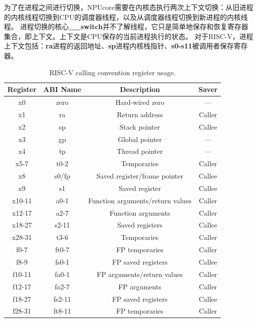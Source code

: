 为了在进程之间进行切换，NPUcore需要在内核态执行两次上下文切换：从旧进程的内核线程切换到CPU的调度器线程，以及从调度器线程切换到新进程的内核线程。
进程切换的核心\textbf{\_\_switch}并不了解线程，它只是简单地保存和恢复寄存器集合，即上下文。上下文是CPU保存的当前进程执行的状态。
对于RISC-V，进程上下文包括：\textbf{ra}进程的返回地址、\textbf{sp}进程内核栈指针、\textbf{s0-s11}被调用者保存寄存器。\\

\begin{table}[h]
	\centering
	\begin{tabular}{|c|c|c|c|}
		\hline
		\textbf{Register} & \textbf{ABI Name} & \textbf{Description} & \textbf{Saver} \\
		\hline
		x0 & zero & Hard-wired zero & --- \\
		x1 & ra & Return address & Caller \\
		x2 & sp & Stack pointer & Callee \\
		x3 & gp & Global pointer & --- \\
		x4 & tp & Thread pointer & --- \\
		x5-7 & t0-2 & Temporaries & Caller \\
		x8 & s0/fp & Saved register/frame pointer & Callee \\
		x9 & s1 & Saved register & Callee \\
		x10-11 & a0-1 & Function arguments/return values & Caller \\
		x12-17 & a2-7 & Function arguments & Caller \\
		x18-27 & s2-11 & Saved registers & Callee \\
		x28-31 & t3-6 & Temporaries & Caller \\
		f0-7 & ft0-7 & FP temporaries & Caller \\
		f8-9 & fs0-1 & FP saved registers & Callee \\
		f10-11 & fa0-1 & FP arguments/return values & Caller \\
		f12-17 & fa2-7 & FP arguments & Caller \\
		f18-27 & fs2-11 & FP saved registers & Callee \\
		f28-31 & ft8-11 & FP temporaries & Caller \\
		\hline
	\end{tabular}
	\caption{RISC-V calling convention register usage.}
\end{table}

\newpage

